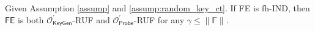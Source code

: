 \begin{corollary}
\label{cor:fh-IPFE:ind-OKeyGen-OEnc-ruf}
Given Assumption \ref{assump} and \ref{assump:random_key_ct}. If \textsf{FE} is fh-IND, then $\textsf{FE}$ is both $\mathcal{O}^\prime_{\textsf{KeyGen}}$-RUF and $\mathcal{O}^\prime_{\textsf{Probe}}$-RUF for any $\gamma \leq \|\mathbb{F}\|$.
\end{corollary}

\fi


% 

\pagebreak

\nocite{*}
\printbibliography



